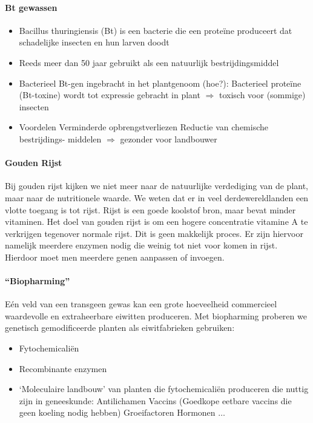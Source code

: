 \documentclass[a4paper,kul]{kulakarticle} %
\begin{document}
\paragraph{Bt gewassen}
\begin{itemize}
	\item Bacillus thuringiensis (Bt) is een bacterie die een
	proteïne produceert dat schadelijke insecten en
	hun larven doodt
	\item Reeds meer dan 50 jaar gebruikt als een
	natuurlijk bestrijdingsmiddel
	\item Bacterieel Bt-gen ingebracht in het plantgenoom
	(hoe?): Bacterieel proteïne (Bt-toxine)
	wordt tot expressie gebracht in plant
	$\Rightarrow$ toxisch voor (sommige) insecten
	\item Voordelen
	\subitem Verminderde opbrengstverliezen
	\subitem Reductie van chemische bestrijdings-
	middelen $\Rightarrow$ gezonder voor landbouwer
\end{itemize}
\paragraph{Gouden Rijst}
Bij gouden rijst kijken we niet meer naar de natuurlijke verdediging van de plant, maar naar de nutritionele waarde. We weten dat er in veel derdewereldlanden een vlotte toegang is tot rijst. Rijst is een goede koolstof bron, maar bevat minder vitaminen. Het doel van gouden rijst is om een hogere concentratie vitamine A te verkrijgen tegenover normale rijst. Dit is geen makkelijk proces. Er zijn hiervoor namelijk meerdere enzymen nodig die weinig tot niet voor komen in rijst. Hierdoor moet men meerdere genen aanpassen of invoegen. 
\paragraph{“Biopharming”}
Eén veld van een transgeen gewas kan een grote hoeveelheid commercieel waardevolle en extraheerbare eiwitten produceren. Met biopharming proberen we genetisch gemodificeerde planten als eiwitfabrieken gebruiken: 
\begin{itemize}
	\item Fytochemicaliën
	\item Recombinante enzymen
	\item `Moleculaire landbouw' van planten die fytochemicaliën produceren die
	nuttig zijn in geneeskunde:
	\subitem Antilichamen
	\subitem Vaccins (Goedkope eetbare vaccins die
	geen koeling nodig hebben)
	\subitem Groeifactoren
	\subitem Hormonen
	\subitem $\ldots$
\end{itemize}
\end{document}
